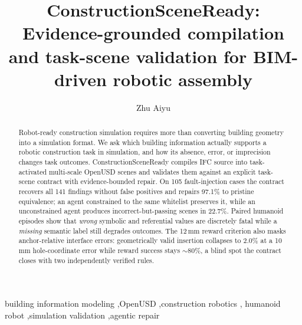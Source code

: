 \documentclass[final,twocolumn,12pt]{elsarticle}
\newcommand{\systemname}{ConstructionSceneReady}
\begin{document}
\linenumbers

\begin{frontmatter}

\title{ConstructionSceneReady: Evidence-grounded compilation and task-scene
validation for BIM-driven robotic assembly}

\author[aff1]{Zhu Aiyu}


\begin{abstract}
Robot-ready construction simulation requires more than converting building
geometry into a simulation format. We ask which building information actually
supports a robotic construction task in simulation, and how its absence,
error, or imprecision changes task outcomes. \systemname{} compiles IFC
source into task-activated multi-scale OpenUSD scenes and validates them
against an explicit task-scene contract with evidence-bounded repair. On 105
fault-injection cases the contract recovers all 141 findings without false
positives and repairs 97.1\% to pristine equivalence; an agent constrained to
the same whitelist preserves it, while an unconstrained agent produces
incorrect-but-passing scenes in 22.7\%. Paired humanoid episodes show that
\emph{wrong} symbolic and referential values are discretely fatal while a
\emph{missing} semantic label still degrades outcomes. The 12\,mm reward
criterion also masks anchor-relative interface errors: geometrically valid
insertion collapses to
2.0\% at a 10\,mm hole-coordinate error while reward success stays
${\sim}80\%$, a blind spot the contract closes with two independently
verified rules.
\end{abstract}

\begin{keyword}
building information modeling \sep OpenUSD \sep construction robotics \sep
humanoid robot \sep simulation validation \sep agentic repair
\end{keyword}

\end{frontmatter}










\end{document}
